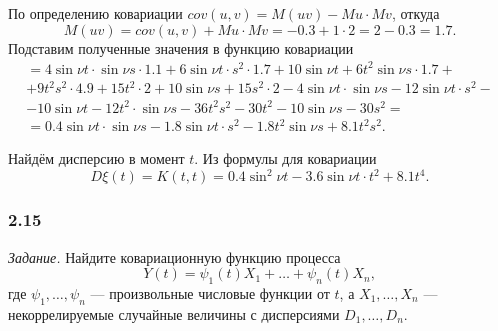 По определению ковариации $cov \left( u, v \right) = M \left( uv \right) - Mu \cdot Mv$,
откуда
$$M \left( uv \right) =
  cov \left( u, v \right) + Mu \cdot Mv =
  -0.3 + 1 \cdot 2 =
  2 - 0.3 =
  1.7.$$
Подставим полученные значения в функцию ковариации
\begin{equation*}
  \begin{split}
    = 4 \sin \nu t \cdot \sin \nu s \cdot 1.1 + 6 \sin \nu t \cdot s^2 \cdot 1.7 + 10 \sin \nu t +
    6t^2 \sin \nu s \cdot 1.7 + \\
    + 9t^2 s^2 \cdot 4.9 + 15t^2 \cdot 2 + 10 \sin \nu s + 15s^2 \cdot 2 -
    4 \sin \nu t \cdot \sin \nu s - 12 \sin \nu t \cdot s^2 - \\
    - 10 \sin \nu t - 12t^2 \cdot \sin \nu s - 36t^2 s^2 - 30t^2 - 10 \sin \nu s - 30s^2 = \\
    = 0.4 \sin \nu t \cdot \sin \nu s - 1.8 \sin \nu t \cdot s^2 - 1.8t^2 \sin \nu s + 8.1t^2 s^2.
  \end{split}
\end{equation*}

Найдём дисперсию в момент $t$.
Из формулы для ковариации
$$D \xi \left( t \right) =
  K \left( t, t \right) =
  0.4 \sin^2 \nu t - 3.6 \sin \nu t \cdot t^2 + 8.1t^4.$$

\subsubsection*{2.15}

\textit{Задание.}
Найдите ковариационную функцию процесса
$$Y \left( t \right) =
  \psi_1 \left( t \right) X_1 + \dotsc + \psi_n \left( t \right) X_n,$$
где $ \psi_1, \dotsc, \psi_n$ --- произвольные числовые функции от $t$, а $X_1, \dotsc, X_n$ ---
некоррелируемые случайные величины с дисперсиями $D_1, \dotsc, D_n$.

